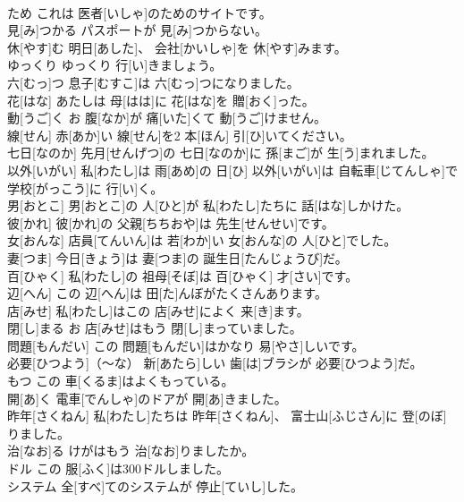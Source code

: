 \documentclass[8pt]{extreport}
\begin{document}
\begin{CJK}{UTF8}{min}
\\	ため	これは 医者[いしゃ]のためのサイトです。		
\\	見[み]つかる	パスポートが 見[み]つからない。		
\\	休[やす]む	明日[あした]、 会社[かいしゃ]を 休[やす]みます。		
\\	ゆっくり	ゆっくり 行[い]きましょう。		
\\	六[むっ]つ	息子[むすこ]は 六[むっ]つになりました。		
\\	花[はな]	あたしは 母[はは]に 花[はな]を 贈[おく]った。		
\\	動[うご]く	お 腹[なか]が 痛[いた]くて 動[うご]けません。		
\\	線[せん]	赤[あか]い 線[せん]を2 本[ほん] 引[ひ]いてください。		
\\	七日[なのか]	先月[せんげつ]の 七日[なのか]に 孫[まご]が 生[う]まれました。		
\\	以外[いがい]	私[わたし]は 雨[あめ]の 日[ひ] 以外[いがい]は 自転車[じてんしゃ]で 学校[がっこう]に 行[い]く。		
\\	男[おとこ]	男[おとこ]の 人[ひと]が 私[わたし]たちに 話[はな]しかけた。		
\\	彼[かれ]	彼[かれ]の 父親[ちちおや]は 先生[せんせい]です。		
\\	女[おんな]	店員[てんいん]は 若[わか]い 女[おんな]の 人[ひと]でした。		
\\	妻[つま]	今日[きょう]は 妻[つま]の 誕生日[たんじょうび]だ。		
\\	百[ひゃく]	私[わたし]の 祖母[そぼ]は 百[ひゃく] 才[さい]です。		
\\	辺[へん]	この 辺[へん]は 田[た]んぼがたくさんあります。		
\\	店[みせ]	私[わたし]はこの 店[みせ]によく 来[き]ます。		
\\	閉[し]まる	お 店[みせ]はもう 閉[し]まっていました。		
\\	問題[もんだい]	この 問題[もんだい]はかなり 易[やさ]しいです。		
\\	必要[ひつよう]（～な）	新[あたら]しい 歯[は]ブラシが 必要[ひつよう]だ。		
\\	もつ	この 車[くるま]はよくもっている。		
\\	開[あ]く	電車[でんしゃ]のドアが 開[あ]きました。		
\\	昨年[さくねん]	私[わたし]たちは 昨年[さくねん]、 富士山[ふじさん]に 登[のぼ]りました。		
\\	治[なお]る	けがはもう 治[なお]りましたか。		
\\	ドル	この 服[ふく]は300ドルしました。		
\\	システム	全[すべ]てのシステムが 停止[ていし]した。		

\end{CJK}
\end{document}
